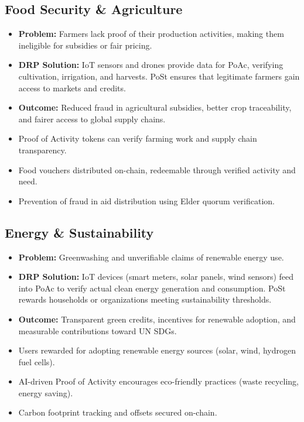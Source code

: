 \documentclass[11pt,a4paper]{article}
\begin{document}
\subsection{Food Security \& Agriculture}
\begin{itemize}
    \item \textbf{Problem:} Farmers lack proof of their production activities, making them ineligible for subsidies or fair pricing.
    \item \textbf{DRP Solution:} IoT sensors and drones provide data for PoAc, verifying cultivation, irrigation, and harvests. PoSt ensures that legitimate farmers gain access to markets and credits.
    \item \textbf{Outcome:} Reduced fraud in agricultural subsidies, better crop traceability, and fairer access to global supply chains.
    \item Proof of Activity tokens can verify farming work and supply chain transparency.
    \item Food vouchers distributed on-chain, redeemable through verified activity and need.
    \item Prevention of fraud in aid distribution using Elder quorum verification.
\end{itemize}

\subsection{Energy \& Sustainability}
\begin{itemize}
    \item \textbf{Problem:} Greenwashing and unverifiable claims of renewable energy use.
    \item \textbf{DRP Solution:} IoT devices (smart meters, solar panels, wind sensors) feed into PoAc to verify actual clean energy generation and consumption. PoSt rewards households or organizations meeting sustainability thresholds.
    \item \textbf{Outcome:} Transparent green credits, incentives for renewable adoption, and measurable contributions toward UN SDGs.
    \item Users rewarded for adopting renewable energy sources (solar, wind, hydrogen fuel cells).
    \item AI-driven Proof of Activity encourages eco-friendly practices (waste recycling, energy saving).
    \item Carbon footprint tracking and offsets secured on-chain.
\end{itemize}
\end{document}
